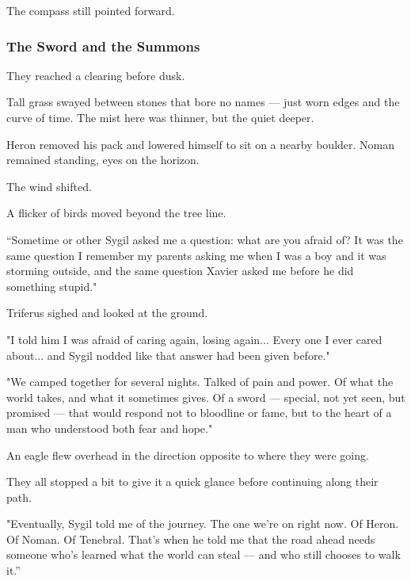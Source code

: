 \documentclass[12pt]{article}
\begin{document}
The compass still pointed forward.

\dotfill

\subsubsection{The Sword and the Summons}

They reached a clearing before dusk.

Tall grass swayed between stones that bore no names — just worn edges and the curve of time. The mist here was thinner, but the quiet deeper.

Heron removed his pack and lowered himself to sit on a nearby boulder. Noman remained standing, eyes on the horizon.

The wind shifted.

A flicker of birds moved beyond the tree line.

\vspace{1em}

“Sometime or other Sygil asked me a question: what are you afraid of? It was the same question I remember my parents asking me when I was a boy and it was storming outside, and the same question Xavier asked me before he did something stupid."

Triferus sighed and looked at the ground.

"I told him I was afraid of caring again, losing again... Every one I ever cared about... and Sygil nodded like that answer had been given before."

\vspace{1em}

"We camped together for several nights. Talked of pain and power. Of what the world takes, and what it sometimes gives. Of a sword — special, not yet seen, but promised — that would respond not to bloodline or fame, but to the heart of a man who understood both fear and hope."

An eagle flew overhead in the direction opposite to where they were going.

They all stopped a bit to give it a quick glance before continuing along their path.

"Eventually, Sygil told me of the journey. The one we're on right now. Of Heron. Of Noman. Of Tenebral. That's when he told me that the road ahead needs someone who’s learned what the world can steal — and who still chooses to walk it.”

\vspace{1em}
\end{document}
